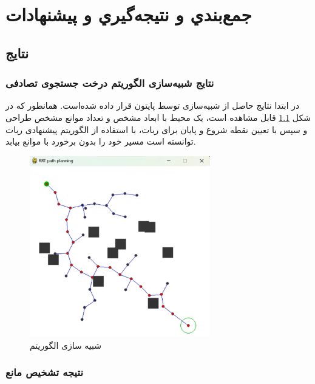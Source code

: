 \chapter{جمع‌بندي و نتيجه‌گيري و پیشنهادات}
\section{نتایج}
\subsection{نتایج شبیه‌سازی الگوریتم درخت جستجوی تصادفی}
در ابتدا نتایج حاصل از شبیه‌سازی توسط پایتون قرار داده‌ شده‌است. همانطور که در شکل
\ref{نتیجه شبیه‌سازی RRT}
قابل مشاهده است، یک محیط با ابعاد مشخص و تعداد موانع مشخص طراحی و سپس با تعیین نقطه شروع و پایان برای ربات، با استفاده از الگوریتم پیشنهادی ربات توانسته است مسیر خود را بدون برخورد با موانع بیابد.
\begin{figure}[H]
	\centering
	\includegraphics[width=0.7\textwidth]{./images/Chapter2/ConvexResult}	
	\caption[شبیه سازی الگوریتم ]{شبیه سازی الگوریتم }
	\label{نتیجه شبیه‌سازی RRT}
\end{figure}
\noindent
\unskip
\newpage

\subsection{نتیجه تشخیص مانع}

